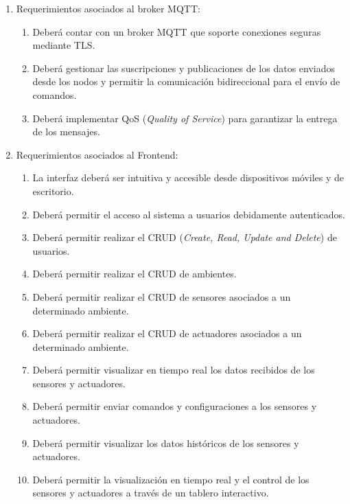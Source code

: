 \begin{enumerate}
	\item Requerimientos asociados al broker MQTT:
	      \begin{enumerate}
		      \item Deberá contar con un broker MQTT que soporte conexiones seguras mediante TLS.
		      \item Deberá gestionar las suscripciones y publicaciones de los datos enviados desde
		            los nodos y permitir la comunicación bidireccional para el envío de comandos.
		      \item Deberá implementar QoS (\textit{Quality of Service}) para garantizar la entrega
		            de los mensajes.
	      \end{enumerate}

	\item Requerimientos asociados al Frontend:
	      \begin{enumerate}
		      \item La interfaz deberá ser intuitiva y accesible desde dispositivos móviles y de
		            escritorio.
		      \item Deberá permitir el acceso al sistema a usuarios debidamente autenticados.
		      \item Deberá permitir realizar el CRUD (\textit{Create, Read, Update and Delete}) de
		            usuarios.
			  \item Deberá permitir realizar el CRUD de ambientes.
		      \item Deberá permitir realizar el CRUD de sensores asociados a un determinado
		            ambiente.
		      \item Deberá permitir realizar el CRUD de actuadores asociados a un determinado
		            ambiente.
		      \item Deberá permitir visualizar en tiempo real los datos recibidos de los sensores y
		            actuadores.
		      \item Deberá permitir enviar comandos y configuraciones a los sensores y actuadores.
		      \item Deberá permitir visualizar los datos históricos de los sensores y actuadores.
		      \item Deberá permitir la visualización en tiempo real y el control de los sensores y
		            actuadores a través de un tablero interactivo.
	      \end{enumerate}


\end{enumerate}
